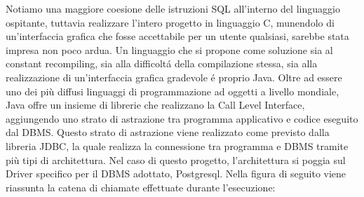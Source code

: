 \documentclass[12pt,a4paper,onecolumn,x11names]{article}
\begin{document}
		\begin{flushleft}
			Notiamo una maggiore coesione delle istruzioni SQL all'interno del linguaggio ospitante, tuttavia realizzare l'intero progetto in linguaggio C, munendolo di un'interfaccia grafica che fosse accettabile per un utente qualsiasi, sarebbe stata impresa non poco ardua.\newline
			Un linguaggio che si propone come soluzione sia al constant recompiling, sia alla difficolt\'{a} della compilazione stessa, sia alla realizzazione di un'interfaccia grafica gradevole \'{e} proprio Java.\newline
			Oltre ad essere uno dei più diffusi linguaggi di programmazione ad oggetti a livello mondiale, Java offre un insieme di librerie che realizzano la Call Level Interface, aggiungendo uno strato di astrazione tra programma applicativo e codice eseguito dal DBMS. Questo strato di astrazione viene realizzato come previsto dalla libreria JDBC, la quale realizza la connessione tra programma e DBMS tramite più tipi di architettura. Nel caso di questo progetto, l'architettura si poggia sul Driver specifico per il DBMS adottato, Postgresql. Nella figura di seguito viene riassunta la catena di chiamate effettuate durante l'esecuzione:		
		\end{flushleft}
\end{document}
